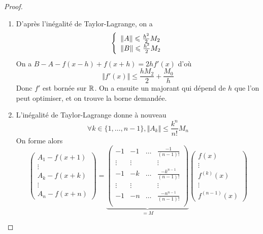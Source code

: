 \begin{proof}
	\phantom{}
	\begin{enumerate}
		\item D'après l'inégalité de Taylor-Lagrange, on a 
		\begin{equation}
		\left\{
			\begin{array}[]{l}
				\Vert A\Vert\leqslant\frac{h^{2}}{2}M_{2}\\
				\Vert B\Vert\leqslant\frac{h^{2}}{2}M_{2}
			\end{array}
		\right.
		\end{equation}
		On a $B-A-f(x-h)+f(x+h)=2hf'(x)$ d'où 
		\begin{equation}\Vert f'(x)\Vert\leqslant\frac{hM_{2}}{2}+\frac{M_{0}}{h}\end{equation}
		Donc $f'$ est bornée sur $\mathbb{R}$. On a ensuite un majorant qui dépend de $h$ que l'on peut optimiser, et on trouve la borne demandée.

		\item L'inégalité de Taylor-Lagrange donne à nouveau
		\begin{equation}\forall k\in\{1,\dots,n-1\},\Vert A_{k}\Vert\leqslant\frac{k^{n}}{n!}M_{n}\end{equation}
		On forme alors
		\begin{equation}
		\begin{pmatrix}
			A_{1}-f(x+1)\\
			\vdots\\
			A_{k}-f(x+k)\\
			\vdots\\
			A_{n}-f(x+n)
		\end{pmatrix}
		=
		\underbrace{
		\begin{pmatrix}
			-1 & -1 & \dots & \frac{-1}{(n-1)!}\\
			\vdots & \vdots & & \vdots\\
			-1 & -k & \dots & \frac{-k^{n-1}}{(n-1)!}\\
			\vdots & \vdots & & \vdots\\
			-1 & -n & \dots & \frac{-n^{n-1}}{(n-1)!}\\
		\end{pmatrix}}_{=M}
		\begin{pmatrix}
			f(x)\\
			\vdots\\
			f^{(k)}(x)\\
			\vdots\\
			f^{(n-1)}(x)
		\end{pmatrix}
		\end{equation}


\end{enumerate}
\end{proof}
